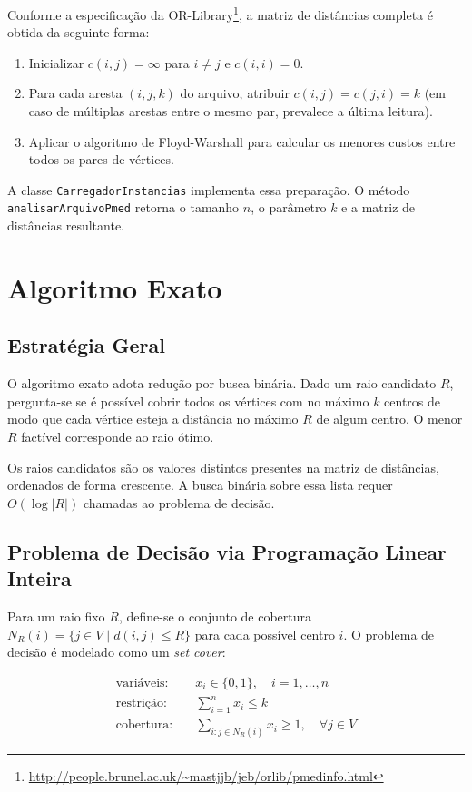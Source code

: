 \documentclass[12pt,a4paper]{article}
\begin{document}
Conforme a especificação da OR-Library\footnote{\url{http://people.brunel.ac.uk/~mastjjb/jeb/orlib/pmedinfo.html}}, a matriz de distâncias completa é obtida da seguinte forma:
\begin{enumerate}
  \item Inicializar $c(i,j) = \infty$ para $i \neq j$ e $c(i,i) = 0$.
  \item Para cada aresta $(i,j,k)$ do arquivo, atribuir $c(i,j) = c(j,i) = k$ (em caso de múltiplas arestas entre o mesmo par, prevalece a última leitura).
  \item Aplicar o algoritmo de Floyd-Warshall para calcular os menores custos entre todos os pares de vértices.
\end{enumerate}

A classe \texttt{CarregadorInstancias} implementa essa preparação. O método \texttt{analisarArquivoPmed} retorna o tamanho $n$, o parâmetro $k$ e a matriz de distâncias resultante.

\section{Algoritmo Exato}

\subsection{Estratégia Geral}

O algoritmo exato adota redução por busca binária. Dado um raio candidato $R$, pergunta-se se é possível cobrir todos os vértices com no máximo $k$ centros de modo que cada vértice esteja a distância no máximo $R$ de algum centro. O menor $R$ factível corresponde ao raio ótimo.

Os raios candidatos são os valores distintos presentes na matriz de distâncias, ordenados de forma crescente. A busca binária sobre essa lista requer $O(\log |R|)$ chamadas ao problema de decisão.

\subsection{Problema de Decisão via Programação Linear Inteira}

Para um raio fixo $R$, define-se o conjunto de cobertura $N_R(i) = \{ j \in V \mid d(i,j) \leq R \}$ para cada possível centro $i$. O problema de decisão é modelado como um \textit{set cover}:

\begin{align*}
  \text{variáveis:} \quad & x_i \in \{0,1\}, \quad i = 1,\ldots,n \\
  \text{restrição:} \quad & \sum_{i=1}^{n} x_i \leq k \\
  \text{cobertura:} \quad & \sum_{i : j \in N_R(i)} x_i \geq 1, \quad \forall j \in V
\end{align*}
\end{document}
